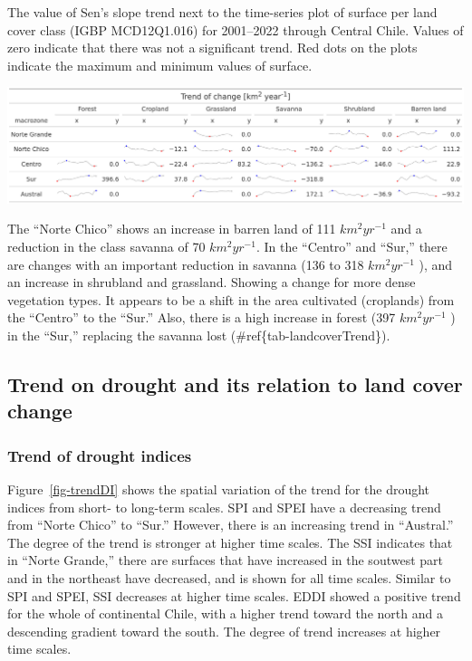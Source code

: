 \documentclass[
  authoryear,
  preprint,
  3p,
  onecolumn]{elsarticle}
\begin{document}
\begin{table}[!ht]
\caption{The value of Sen's slope trend next to the time-series plot of surface per land cover class (IGBP MCD12Q1.016) for 2001–2022 through Central Chile. Values of zero indicate that there was not a significant trend. Red dots on the plots indicate the maximum and minimum values of surface.}
\label{tab-landcoverTrend}
\includegraphics[]{../output/figs/table_var_landcover_macro.png}
\end{table}

The ``Norte Chico'' shows an increase in barren land of 111
\(km^2 yr^{-1}\) and a reduction in the class savanna of 70
\(km^2 yr^{-1}\). In the ``Centro'' and ``Sur,'' there are changes with
an important reduction in savanna (136 to 318 \(km^2 yr^{-1}\) ), and an
increase in shrubland and grassland. Showing a change for more dense
vegetation types. It appears to be a shift in the area cultivated
(croplands) from the ``Centro'' to the ``Sur.'' Also, there is a high
increase in forest (397 \(km^2 yr^{-1}\) ) in the ``Sur,'' replacing the
savanna lost (\#ref\{tab-landcoverTrend\}).

\hypertarget{trend-on-drought-and-its-relation-to-land-cover-change}{%
\subsection{Trend on drought and its relation to land cover
change}\label{trend-on-drought-and-its-relation-to-land-cover-change}}

\hypertarget{trend-of-drought-indices-1}{%
\subsubsection{Trend of drought
indices}\label{trend-of-drought-indices-1}}

Figure~\ref{fig-trendDI} shows the spatial variation of the trend for
the drought indices from short- to long-term scales. SPI and SPEI have a
decreasing trend from ``Norte Chico'' to ``Sur.'' However, there is an
increasing trend in ``Austral.'' The degree of the trend is stronger at
higher time scales. The SSI indicates that in ``Norte Grande,'' there
are surfaces that have increased in the soutwest part and in the
northeast have decreased, and is shown for all time scales. Similar to
SPI and SPEI, SSI decreases at higher time scales. EDDI showed a
positive trend for the whole of continental Chile, with a higher trend
toward the north and a descending gradient toward the south. The degree
of trend increases at higher time scales.
\end{document}

